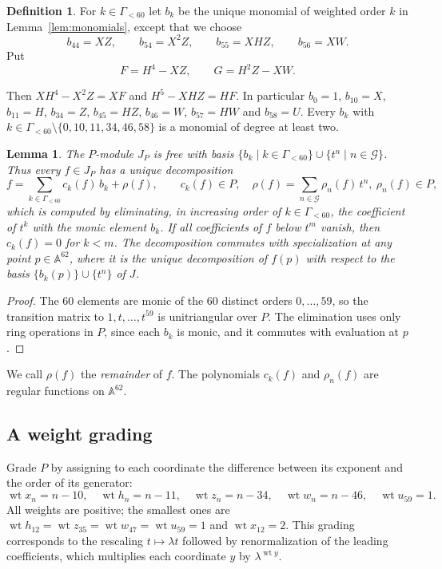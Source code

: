\documentclass{amsart}
\newtheorem{lemma}[theorem]{Lemma}
\theoremstyle{definition}
\newtheorem{definition}[theorem]{Definition}
\theoremstyle{remark}
\numberwithin{equation}{section}
\newcommand{\AF}{\mathbb{A}}
\DeclareMathOperator{\wt}{wt}
\begin{document}
\begin{definition}\label{def:basis}
For $k\in\Gamma_{<60}$ let $b_k$ be the unique monomial of weighted order $k$ in Lemma~\ref{lem:monomials}, except that we choose
\[
b_{44}=XZ,\qquad b_{54}=X^2Z,\qquad b_{55}=XHZ,\qquad b_{56}=XW.
\]
Put
\[
F=H^4-XZ,\qquad G=H^2Z-XW .
\]
\end{definition}

Then $XH^4-X^2Z=XF$ and $H^5-XHZ=HF$. In particular $b_0=1$, $b_{10}=X$, $b_{11}=H$, $b_{34}=Z$, $b_{45}=HZ$, $b_{46}=W$, $b_{57}=HW$ and $b_{58}=U$. Every $b_k$ with $k\in\Gamma_{<60}\setminus\{0,10,11,34,46,58\}$ is a monomial of degree at least two.

\begin{lemma}\label{lem:division}
The $P$-module $J_P$ is free with basis $\{b_k\mid k\in\Gamma_{<60}\}\cup\{t^n\mid n\in\mathcal G\}$. Thus every $f\in J_P$ has a unique decomposition
\[
f=\sum_{k\in\Gamma_{<60}}c_k(f)\,b_k+\rho(f),\qquad c_k(f)\in P,\quad \rho(f)=\sum_{n\in\mathcal G}\rho_n(f)\,t^n,\ \rho_n(f)\in P,
\]
which is computed by eliminating, in increasing order of $k\in\Gamma_{<60}$, the coefficient of $t^k$ with the monic element $b_k$. If all coefficients of $f$ below $t^{m}$ vanish, then $c_k(f)=0$ for $k<m$. The decomposition commutes with specialization at any point $p\in\AF^{62}$, where it is the unique decomposition of $f(p)$ with respect to the basis $\{b_k(p)\}\cup\{t^n\}$ of $J$.
\end{lemma}

\begin{proof}
The $60$ elements are monic of the $60$ distinct orders $0,\dots,59$, so the transition matrix to $1,t,\dots,t^{59}$ is unitriangular over $P$. The elimination uses only ring operations in $P$, since each $b_k$ is monic, and it commutes with evaluation at $p$.
\end{proof}

We call $\rho(f)$ the \emph{remainder} of $f$. The polynomials $c_k(f)$ and $\rho_n(f)$ are regular functions on $\AF^{62}$.

\subsection{A weight grading}\label{sec:grading}
Grade $P$ by assigning to each coordinate the difference between its exponent and the order of its generator:
\[
\wt x_n=n-10,\quad \wt h_n=n-11,\quad \wt z_n=n-34,\quad \wt w_n=n-46,\quad \wt u_{59}=1.
\]
All weights are positive; the smallest ones are $\wt h_{12}=\wt z_{35}=\wt w_{47}=\wt u_{59}=1$ and $\wt x_{12}=2$. This grading corresponds to the rescaling $t\mapsto\lambda t$ followed by renormalization of the leading coefficients, which multiplies each coordinate $y$ by $\lambda^{\wt y}$.
\end{document}
